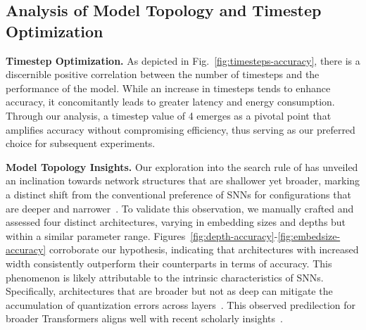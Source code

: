 \documentclass{article}
\theoremstyle{plain}
\theoremstyle{definition}
\theoremstyle{remark}
\begin{document}
\subsection{Analysis of Model Topology and Timestep Optimization}

\textbf{Timestep Optimization.} As depicted in Fig.~\ref{fig:timesteps-accuracy}, there is a discernible positive correlation between the number of timesteps and the performance of the model. While an increase in timesteps tends to enhance accuracy, it concomitantly leads to greater latency and energy consumption. Through our analysis, a timestep value of 4 emerges as a pivotal point that amplifies accuracy without compromising efficiency, thus serving as our preferred choice for subsequent experiments.

\textbf{Model Topology Insights.} Our exploration into the search rule of \sysname has unveiled an inclination towards network structures that are shallower yet broader, marking a distinct shift from the conventional preference of SNNs for configurations that are deeper and narrower~\cite{zhengGoingDeeperDirectlyTrained2020}. To validate this observation, we manually crafted and assessed four distinct architectures, varying in embedding sizes and depths but within a similar parameter range. Figures~\ref{fig:depth-accuracy}-\ref{fig:embedsize-accuracy} corroborate our hypothesis, indicating that architectures with increased width consistently outperform their counterparts in terms of accuracy. This phenomenon is likely attributable to the intrinsic characteristics of SNNs. Specifically, architectures that are broader but not as deep can mitigate the accumulation of quantization errors across layers~\cite{buOptimalANNSNNConversion2021}. This observed predilection for broader Transformers aligns well with recent scholarly insights~\cite{zhaiScalingVisionTransformers2022}.

\end{document}
